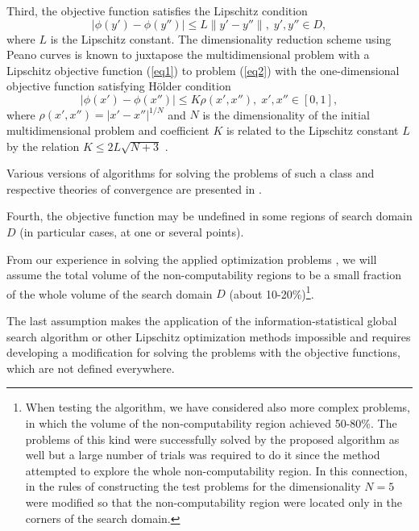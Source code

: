 \documentclass[runningheads]{llncs}
\begin{document}
Third, the objective function satisfies the Lipschitz condition
\begin{equation}\label{eq3} 
| \phi (y')-\phi (y'') | \leq L \| y'-y'' \|, \; y',y'' \in D,
\end{equation}
where $L$ is the Lipschitz constant. The dimensionality reduction scheme using Peano curves is known to juxtapose the multidimensional problem with a Lipschitz objective function (\ref{eq1}) to problem (\ref{eq2}) with the one-dimensional objective function satisfying H{\"o}lder condition
\begin{equation}\label{eq4} 
| \phi (x')-\phi (x'') | \leq K \rho(x',x''), \; x',x'' \in [0,1],
\end{equation}
where $\rho(x',x'') =  |x' - x''|^{1/N}$ and $N$ is the dimensionality of the initial multidimensional problem and coefficient $K$ is related to the Lipschitz constant $L$ by the relation $K \leq 2L\sqrt {N+3}$ \cite{Strongin2000}.

Various versions of algorithms for solving the problems of such a class and respective theories of convergence are presented in \cite{Sergeyev2013,Strongin2000}.

Fourth, the objective function may be undefined in some regions of search domain $D$ (in particular cases, at one or several points).

From our experience in solving the applied optimization problems \cite{Barkalov2022,Gubaydullin2022}, we will assume the total volume of the non-computability regions to be a small fraction of the whole volume of the search domain $D$ (about 10-20\%)\footnote{When testing the algorithm, we have considered also more complex problems, in which the volume of the non-computability region achieved 50-80\%. The problems of this kind were successfully solved by the proposed algorithm as well but a large number of trials was required to do it since the method attempted to explore the whole non-computability region. In this connection, in the rules of constructing the test problems for the dimensionality $N=5$ were modified so that the non-computability region were located only in the corners of the search domain.}.

The last assumption makes the application of the information-statistical global search algorithm \cite{Strongin2000} or other Lipschitz optimization methods \cite{PaulaviciusZilinskas2014,Sergeyev2017} impossible and requires developing a modification for solving the problems with the objective functions, which are not defined everywhere.
\end{document}
